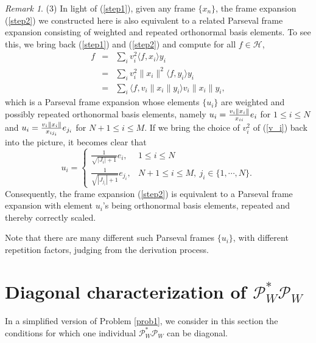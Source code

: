 \documentclass[11pt,reqno]{amsart}
\theoremstyle{remark}
\newtheorem{remark}[thm]{Remark}
\begin{document}
\begin{remark}
(3)   In light of (\ref{step1}), given any frame $\{x_n\}$, the frame expansion (\ref{step2}) we constructed here is also equivalent to a related Parseval frame expansion consisting of weighted and repeated
orthonormal basis elements.   To see this, we bring back (\ref{step1}) and (\ref{step2})
and compute for all $f\in {\mathcal H}$,
\begin{eqnarray*}
f &=& \sum_i v_i^2 {\langle} f, x_i{\rangle} y_i  \\
  &=& \sum_i v_i^2\|x_i\|^2{\langle} f, y_i{\rangle} y_i \\
  &=& \sum_i {\langle} f, v_i\|x_i\|y_i{\rangle} v_i\|x_i\|y_i,
\end{eqnarray*}
which is a Parseval frame expansion whose elements $\{u_i\}$ are weighted and possibly repeated
orthonormal basis elements, namely ${\displaystyle} u_i=\frac{v_i\|x_i\|}{x_{ii}}e_i$ for $1\leq i\leq N$ and
${\displaystyle} u_i=\frac{v_i\|x_i\|}{x_{ij_i}}e_{j_i}$ for $N+1\leq i\leq M$.   If we bring
 the choice of $v_i^2$ of (\ref{v_i}) back into the picture, it becomes clear that
\[
u_i=\left\{\begin{array}{ll}
\frac{1}{\sqrt{|J_i|+1}}e_i, & 1\le i\le N \\
\frac{1}{\sqrt{|J_{j_i}|+1}}e_{j_i}, & N+1\le i\le M, \ j_i\in \{1,\cdots,N\}.
           \end{array}\right.
\]
Consequently, the frame expansion (\ref{step2}) is equivalent to a Parseval frame expansion with element $u_i$'s being orthonormal basis elements, repeated and thereby correctly scaled.

Note that there are many different such Parseval frames $\{u_i\}$, with different repetition factors, judging from the derivation process.

\end{remark}

\section{Diagonal characterization of ${{\mathcal P}}_W^*{{\mathcal P}}_W$} \label{sec_diag}

In a simplified version of Problem \ref{prob1}, we consider in this section the conditions for which one individual ${{\mathcal P}}_W^*{{\mathcal P}}_W$ can be diagonal.
\end{document}
